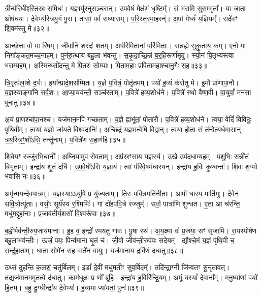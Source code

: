 त्रीन्प॑रि॒धीꣴस्ति॒स्रः स॒मिधः॑।
य॒ज्ञायु॑रनु\-सञ्च॒रान्।
उ॒प॒वे॒षं मेक्ष॑णं॒ धृष्टिम्᳚।
सं भ॑रामि सुस॒म्भृता᳚।
या जा॒ता ओष॑धयः।
दे॒वेभ्य॑स्त्रियु॒गं पु॒रा।
तासां॒ पर्व॑ राध्यासम्।
प॒रि॒स्त॒रमा॒हरन्॑।
अ॒पां मेध्यं॑ य॒ज्ञियम्᳚।
सदे॑वꣳ शि॒वम॑स्तु मे॥३२॥

आ॒च्छे॒त्ता वो॒ मा रि॑षम्।
जीवा॑नि श॒रदः॑ श॒तम्।
अप॑रिमितानां॒ परि॑मिताः।
सन्न॑ह्ये सुकृ॒ताय॒ कम्।
एनो॒ मा निगा᳚ङ्कत॒मच्च॒नाहम्।
पुन॑रु॒त्थाय॑ बहु॒ला भ॑वन्तु।
स॒कृ॒दा॒च्छि॒न्नं ब॒र्॒हिरूर्णा॑मृदु।
स्यो॒नं पि॒तृभ्य॑स्त्वा भराम्य॒हम्।
अ॒स्मिन्थ्सी॑दन्तु मे पि॒तरः॑ सो॒म्याः।
पि॒ता॒म॒हाः प्रपि॑तामहाश्चानु॒गैः स॒ह॥३३॥

त्रि॒वृत्प॑ला॒शे द॒र्भः।
इया᳚न्प्रादे॒शस॑म्मितः।
य॒ज्ञे प॒वित्रं॒ पोतृ॑तमम्।
पयो॑ ह॒व्यं क॑रोतु मे।
इ॒मौ प्रा॑णापा॒नौ।
य॒ज्ञस्याङ्गा॑नि सर्व॒शः।
आ॒प्या॒यय॑न्तौ॒ सञ्च॑रताम्।
प॒वित्रे॑ हव्य॒शोध॑ने।
प॒वित्रे᳚ स्थो वैष्ण॒वी।
वा॒युर्वां॒ मन॑सा पुनातु॥३४॥

अ॒यं प्रा॒णश्चा॑पा॒नश्च॑।
यज॑मान॒मपि॑ गच्छताम्।
य॒ज्ञे ह्यभू॑तां॒ पोता॑रौ।
प॒वित्रे॑ हव्य॒शोध॑ने।
त्वया॒ वेदिं॑ विविदुः पृथि॒वीम्।
त्वया॑ य॒ज्ञो जा॑यते विश्व॒दानिः॑।
अच्छि॑द्रं य॒ज्ञमन्वे॑षि वि॒द्वान्।
त्वया॒ होता॒ सं त॑नोत्यर्धमा॒सान्।
त्र॒य॒स्त्रि॒ꣳ॒शो॑ऽसि॒ तन्तू॑नाम्।
प॒वित्रे॑ण स॒हाग॑हि॥३५॥

शि॒वेयꣳ रज्जु॑रभि॒धानी᳚।
अ॒घ्नि॒यामुप॑ सेवताम्।
अप्र॑स्रꣳसाय य॒ज्ञस्य॑।
उ॒खे उप॑दधाम्य॒हम्।
प॒शुभिः॒ सन्नी॑तं बिभृताम्।
इन्द्रा॑य शृ॒तं दधि॑।
उ॒प॒वे॒षो॑ऽसि य॒ज्ञाय॑।
त्वां प॑रिवे॒षम॑धारयन्।
इन्द्रा॑य ह॒विः कृ॒ण्वन्तः॑।
शि॒वः श॒ग्मो भ॑वासि नः॥३६॥

अमृ॑न्मयन्देवपा॒त्रम्।
य॒ज्ञस्याऽऽयु॑षि॒ प्र यु॑ज्यताम्।
ति॒रः॒ प॒वि॒त्रमति॑नीताः।
आपो॑ धारय॒ माति॑गुः।
दे॒वेन॑ सवि॒त्रोत्पू॑ताः।
वसोः॒ सूर्य॑स्य र॒श्मिभिः॑।
गां दो॑हपवि॒त्रे रज्जुम्᳚।
सर्वा॒ पात्रा॑णि शुन्धत।
ए॒ता आ च॑रन्ति॒ मधु॑म॒द्दुहा॑नाः।
प्र॒जाव॑तीर्य॒शसो॑ वि॒श्वरू॑पाः॥३७॥

ब॒ह्वीर्भव॑न्ती॒रुप॒जाय॑मानाः।
इ॒ह व॒ इन्द्रो॑ रमयतु गावः।
पू॒षा स्थ॑।
अ॒य॒क्ष्मा वः॑ प्र॒जया॒ सꣳ सृ॑जामि।
रा॒यस्पोषे॑ण बहु॒लाभव॑न्तीः।
ऊर्जं॒ पयः॒ पिन्व॑माना घृ॒तं च॑।
जी॒वो जीव॑न्ती॒रुप॑वः सदेयम्।
द्यौश्चे॒मं य॒ज्ञं पृ॑थि॒वी च॒ सन्दु॑हाताम्।
धा॒ता सोमे॑न स॒ह वाते॑न वा॒युः।
यज॑मानाय॒ द्रवि॑णं दधातु॥३८॥

उथ्सं॑ दुहन्ति क॒लशं॒ चतु॑र्बिलम्।
इडां᳚ दे॒वीं मधु॑मतीꣳ सुव॒र्विदम्᳚।
तदि॑न्द्रा॒ग्नी जि॑न्वतꣳ सू॒नृता॑वत्।
तद्यज॑मान\-ममृत॒त्वे द॑धातु।
काम॑धुक्षः॒ प्र णो᳚ ब्रूहि।
इन्द्रा॑य ह॒विरि॑न्द्रि॒यम्।
अ॒मूं यस्यां᳚ दे॒वाना᳚म्।
म॒नु॒ष्या॑णां॒ पयो॑ हि॒तम्।
ब॒हु दु॒ग्धीन्द्रा॑य दे॒वेभ्यः॑।
ह॒व्यमा प्या॑यतां॒ पुनः॑॥३९॥

